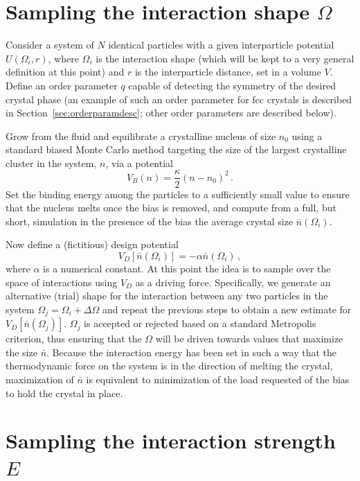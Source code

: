 \section{Sampling the interaction shape $\Omega$}

Consider a system of $N$ identical particles with a given interparticle potential $U(\Omega_i,r)$, where $\Omega_i$ is the interaction shape (which will be kept to a very general definition at this point) and $r$ is the interparticle distance, set in a volume $V$.
Define an order parameter $q$ capable of detecting the symmetry of the desired crystal phase (an example of such an order parameter for fcc crystals is described in Section~\ref{sec:orderparamdesc}; other order parameters are described below).

Grow from the fluid and equilibrate a crystalline nucleus of size $n_0$ using a standard biased Monte Carlo method targeting the size of the largest crystalline cluster in the system, $n$, via a potential~\cite{tenwolde2} 
\begin{equation}
	V_B(n)=\frac{\kappa}{2} (n-n_0)^2 \,.
\end{equation}
Set the binding energy among the particles to a sufficiently small value to ensure that the nucleus melts once the bias is removed, and compute from a full, but short, simulation in the presence of the bias the average crystal size $\bar n(\Omega_i)$.

Now define a (fictitious) design potential 
\begin{equation}
	V_D[\bar n(\Omega_i)]=-\alpha \bar n(\Omega_i) \,,
\end{equation}
where $\alpha$ is a numerical constant. 
At this point the idea is to sample over the space of interactions using $V_D$ as a driving force.
Specifically, we generate an alternative (trial) shape for the interaction between any two particles in the system $\Omega_j=\Omega_i+\Delta\Omega$ and repeat the previous steps to obtain a new estimate for $V_D[\bar n(\Omega_j)]$.
$\Omega_j$ is accepted or rejected based on a standard Metropolis criterion, thus ensuring that the $\Omega$ will be driven towards values that maximize the size $\bar n$.
Because the interaction energy has been set in such a way that the thermodynamic force on the system is in the direction of melting the crystal, maximization of $\bar n$ is equivalent to minimization of the load requested of the bias to hold the crystal in place.
 
\section{Sampling the interaction strength $E$}

